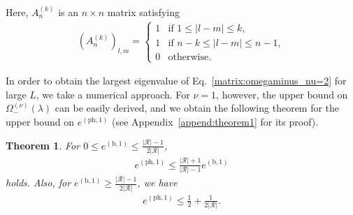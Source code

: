 \documentclass[twocolumn,superscriptaddress,pra,footinbib,notitlepage]{revtex4-1}
\newcommand{\1}{\mbox{1}\hspace{-0.25em}\mbox{l}}
\newcommand{\abs}[1]{\lvert#1\rvert}
\newtheorem{theo}{Theorem}
\begin{document}
Here, $A^{(k)}_n$ is an $n\times n$ matrix satisfying
\begin{align}
(A^{(k)}_n)_{l, m}=
\begin{cases}
1&\textrm{if }1\leq\abs{l-m}\leq k,\\
1&\textrm{if }n-k\leq\abs{l-m}\leq n-1,\\
0&\textrm{otherwise}.
\end{cases}
\end{align}
\begin{comment}
For example, we substitute $\abs{\mathcal{R}}=2$ and $L=5$ to Eq.~\eqref{matrix:omegaminus_nu=2} and we obtain
\begin{align}
\left[
\begin{array}{ccccc}
\frac{1-2\lambda}{4}&\frac{\lambda}{4}&0&0&\frac{\lambda}{4}\\
\frac{\lambda}{4}&\frac{1-\lambda}{2}&\frac{\lambda}{4}&0&0\\
0&\frac{\lambda}{4}&\frac{1-2\lambda}{4}&\frac{\lambda}{4}&0\\
0&0&\frac{\lambda}{4}&-\frac{\lambda}{2}&\frac{\lambda}{4}\\
\frac{\lambda}{4}&0&0&\frac{\lambda}{4}&-\frac{\lambda}{2}
\end{array}
\right].
\end{align}
\end{comment}
\begin{comment}
\begin{align}
\left[
\begin{array}{ccccc}
(1-2\lambda)/4&\lambda/4&0&0&\lambda/4\\
\lambda/4&(1-\lambda)/2&\lambda/4&0&0\\
0&\lambda/4&(1-2\lambda)/4&\lambda/4&0\\
0&0&\lambda/4&-\lambda/2&\lambda/4\\
\lambda/4&0&0&\lambda/4&-\lambda/2
\end{array}
\right].
\end{align}
\end{comment}
In order to obtain the largest eigenvalue of Eq.~\eqref{matrix:omegaminus_nu=2} for large $L$, we take a numerical approach. For $\nu=1$, however, the upper bound on $\Omega_-^{(\nu)}(\lambda)$ can be easily derived, and we obtain the following theorem for the upper bound on $e^{(\textrm{ph}, 1)}$ (see Appendix~\ref{append:theorem1} for its proof).
\begin{theo}
For $0\leq e^{(\mathrm{b}, 1)}\leq\frac{\abs{\mathcal{R}}-1}{2\abs{\mathcal{R}}}$,
\begin{align}
e^{(\mathrm{ph}, 1)}\leq\frac{\abs{\mathcal{R}}+1}{\abs{\mathcal{R}}-1}e^{(\mathrm{b}, 1)}
\label{eq:phase_error_nu=1}
\end{align}
holds. Also, for $e^{(\mathrm{b}, 1)}\geq\frac{\abs{\mathcal{R}}-1}{2\abs{\mathcal{R}}}$, we have
\begin{align}
e^{(\mathrm{ph}, 1)}\leq\frac{1}{2}+\frac{1}{2\abs{\mathcal{R}}}.
\end{align}
\label{theo:phase_error_nu=1}
\end{theo}
\end{document}
